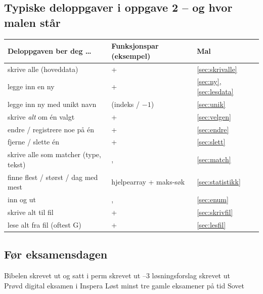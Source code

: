 \subsection{Typiske deloppgaver i oppgave 2 -- og hvor malen står}
\begin{center}
\begin{tabular}{@{}L{5.6cm}L{7.6cm}L{2.0cm}@{}}
\toprule
\textbf{Deloppgaven ber deg \dots} & \textbf{Funksjonspar (eksempel)} & \textbf{Mal} \\
\midrule
skrive alle (hoveddata) &  +  & \ref{sec:skrivalle} \\
legge inn en ny &  +  & \ref{sec:ny}, \ref{sec:lesdata} \\
legge inn ny med unikt navn &  (indeks / $-1$) & \ref{sec:unik} \\
skrive \emph{alt} om én valgt &  +  & \ref{sec:velgen} \\
endre / registrere noe på én &  +  & \ref{sec:endre} \\
fjerne / slette én &  +  & \ref{sec:slett} \\
skrive alle som matcher (type, tekst) & ,  & \ref{sec:match} \\
finne flest / størst / dag med mest & hjelpearray + maks-søk & \ref{sec:statistikk} \\
 inn og ut & ,  & \ref{sec:enum} \\
skrive alt til fil &  +  & \ref{sec:skrivfil} \\
lese alt fra fil (oftest G) &  +  & \ref{sec:lesfil} \\
\bottomrule
\end{tabular}
\end{center}

\subsection*{Før eksamensdagen}
\boks Bibelen skrevet ut og satt i perm \quad \boks {} skrevet ut \quad {}--3 løsningsforslag skrevet ut\\
\boks Prøvd digital eksamen i Inspera \quad \boks Løst minst tre gamle eksamener på tid \quad \boks Sovet
